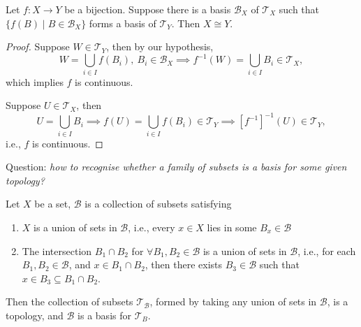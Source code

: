 \begin{corollary}\label{cor:3:1}
Let $f:X\to Y$ be a bijection. Suppose there is a basis $\mathcal{B}_X$ of $\mathcal{T}_X$ such that $\{f(B)\mid B\in\mathcal{B}_X\}$ forms a basis of $\mathcal{T}_Y$. Then $X\cong Y$.
\end{corollary}
\begin{proof}
Suppose $W\in\mathcal{T}_Y$, then by our hypothesis,
\[
W=\bigcup_{i\in I}f(B_i),\
B_i\in\mathcal{B}_X\implies
f^{-1}(W)=\bigcup_{i\in I}B_i\in\mathcal{T}_X,
\]
which implies $f$ is continuous.

Suppose $U\in\mathcal{T}_X$, then
\[
U=\bigcup_{i\in I}B_i\implies
f(U)=\bigcup_{i\in I}f(B_i)\in\mathcal{T}_Y\implies
[f^{-1}]^{-1}(U)\in\mathcal{T}_Y,
\]
i.e., $f$ is continuous.
\end{proof}

Question: \textit{how to recognise 
whether a family of subsets is a basis for some given topology?}

\begin{proposition}
\label{pro:3:4:1}
Let $X$ be a set, $\mathcal{B}$ is a collection of subsets satisfying
\begin{enumerate}
\item
$X$ is a union of sets in $\mathcal{B}$, i.e., 
every $x\in X$ lies in some $B_x\in\mathcal{B}$
\item
The intersection $B_1\cap B_2$ for $\forall B_1,B_2\in\mathcal{B}$ is a union of sets in $\mathcal{B}$, i.e., for each $B_1,B_2\in\mathcal{B}$, and $x\in B_1\cap B_2$, then there exists $B_3\in\mathcal{B}$ such that $x\in B_3\subseteq B_1\cap B_2$.
\end{enumerate}
Then the collection of subsets $\mathcal{T}_{\mathcal{B}}$, formed by taking any union of sets in $\mathcal{B}$, is a topology, and $\mathcal{B}$ is a basis for $\mathcal{T}_B$.
\end{proposition}

